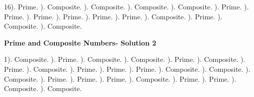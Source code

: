 \documentclass{article}%
\begin{document}
16). Prime.%
). Composite.%
). Composite.%
). Composite.%
). Composite.%
). Prime.%
). Prime.%
). Prime.%
). Prime.%
). Prime.%
). Prime.%
). Composite.%
). Prime.%
). Composite.%
). Composite.%
\newline%
\newpage%
\large%
\begin{center}%
\textbf{Prime and Composite Numbers- Solution 2}%
\newline%
\end{center} \normalsize%
1). Composite.%
). Prime.%
). Composite.%
). Composite.%
). Prime.%
). Composite.%
). Prime.%
). Composite.%
). Prime.%
). Prime.%
). Prime.%
). Composite.%
). Composite.%
). Composite.%
). Prime.%
). Prime.%
). Prime.%
). Composite.%
). Prime.%
). Prime.%
). Composite.%
). Composite.%
\newline%
\end{document}
